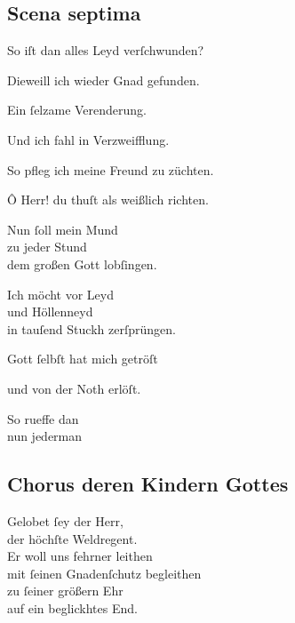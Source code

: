 \documentclass{ees}
\newenvironment{lyrics}[1]{%
  \subsection{#1}\nopagebreak%
  \begin{lyricslist}%
  \let\voice\item%
}{%
  \end{lyricslist}%
}
\begin{document}
\begin{lyrics}{Scena septima}
  \voice[Jobs Frau]
  So iſt dan alles Leyd verſchwunden?

  \voice[Job]
  Dieweill ich wieder Gnad gefunden.

  \voice[Eliphas]
  Ein ſelzame Verenderung.

  \voice[Leviathan]
  Und ich fahl in Verzweifflung.

  \voice[Schöpffer]
  So pfleg ich meine Freund zu züchten.

  \voice[Job]
  Ô Herr! du thuſt als weißlich richten.

  \voice[Jobs Frau]
  Nun ſoll mein Mund\\
  zu jeder Stund\\
  dem großen Gott lobſingen.

  \voice[Leviathan]
  Ich möcht vor Leyd\\
  und Höllenneyd\\
  in tauſend Stuckh zerſprüngen.

  \voice[Job]
  Gott ſelbſt hat mich getröſt

  \voice[Eliphas]
  und von der Noth erlöſt.

  \voice[Jobs Frau]
  So rueffe dan\\
  nun jederman
\end{lyrics}

\begin{lyrics}{Chorus deren Kindern Gottes}
  \voice[Die Kinder Gottes]
  Gelobet ſey der Herr,\\
  der höchſte Weldregent.\\
  Er woll uns fehrner leithen\\
  mit ſeinen Gnadenſchutz begleithen\\
  zu ſeiner größern Ehr\\
  auf ein beglickhtes End.
\end{lyrics}
\end{document}
